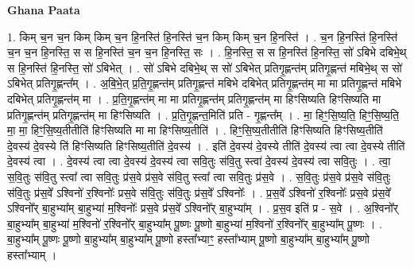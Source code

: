 \documentclass[17pt]{extarticle}
\begin{document}
\textbf{Ghana Paata } \newline

1. किम् च॒न च॒न किम् किम् च॒न हि॒नस्ति॑ हि॒नस्ति॑ च॒न किम् किम् च॒न हि॒नस्ति॑ । . च॒न हि॒नस्ति॑ हि॒नस्ति॑ च॒न च॒न हि॒नस्ति॒ स स हि॒नस्ति॑ च॒न च॒न हि॒नस्ति॒ सः । . हि॒नस्ति॒ स स हि॒नस्ति॑ हि॒नस्ति॒ सो॑ ऽबिभे दबिभे॒थ् स हि॒नस्ति॑ हि॒नस्ति॒ सो॑ ऽबिभेत् । . सो॑ ऽबिभे दबिभे॒थ् स सो॑ ऽबिभेत् प्रतिगृ॒ह्णन्त॑म् प्रतिगृ॒ह्णन्त॑ मबिभे॒थ् स सो॑ ऽबिभेत् प्रतिगृ॒ह्णन्त᳚म् । . अ॒बि॒भे॒त् प्र॒ति॒गृ॒ह्णन्त॑म् प्रतिगृ॒ह्णन्त॑ मबिभे दबिभेत् प्रतिगृ॒ह्णन्त॑म् मा मा प्रतिगृ॒ह्णन्त॑ मबिभे दबिभेत् प्रतिगृ॒ह्णन्त॑म् मा । . प्र॒ति॒गृ॒ह्णन्त॑म् मा मा प्रतिगृ॒ह्णन्त॑म् प्रतिगृ॒ह्णन्त॑म् मा हिꣳसिष्यति हिꣳसिष्यति मा प्रतिगृ॒ह्णन्त॑म् प्रतिगृ॒ह्णन्त॑म् मा हिꣳसिष्यति । . प्र॒ति॒गृ॒ह्णन्त॒मिति॑ प्रति - गृ॒ह्णन्त᳚म् । . मा॒ हिꣳ॒॒सि॒ष्य॒ति॒ हिꣳ॒॒सि॒ष्य॒ति॒ मा॒ मा॒ हिꣳ॒॒सि॒ष्य॒तीतीति॑ हिꣳसिष्यति मा मा हिꣳसिष्य॒तीति॑ । . हिꣳ॒॒सि॒ष्य॒तीतीति॑ हिꣳसिष्यति हिꣳसिष्य॒तीति॑ दे॒वस्य॑ दे॒वस्ये ति॑ हिꣳसिष्यति हिꣳसिष्य॒तीति॑ दे॒वस्य॑ । . इति॑ दे॒वस्य॑ दे॒वस्ये तीति॑ दे॒वस्य॑ त्वा त्वा दे॒वस्ये तीति॑ दे॒वस्य॑ त्वा । . दे॒वस्य॑ त्वा त्वा दे॒वस्य॑ दे॒वस्य॑ त्वा सवि॒तुः स॑वि॒तु स्त्वा॑ दे॒वस्य॑ दे॒वस्य॑ त्वा सवि॒तुः । . त्वा॒ स॒वि॒तुः स॑वि॒तु स्त्वा᳚ त्वा सवि॒तुः प्र॑स॒वे प्र॑स॒वे स॑वि॒तु स्त्वा᳚ त्वा सवि॒तुः प्र॑स॒वे । . स॒वि॒तुः प्र॑स॒वे प्र॑स॒वे स॑वि॒तुः स॑वि॒तुः प्र॑स॒वे᳚ ऽश्विनो॑ र॒श्विनोः᳚ प्रस॒वे स॑वि॒तुः स॑वि॒तुः प्र॑स॒वे᳚ ऽश्विनोः᳚ । . प्र॒स॒वे᳚ ऽश्विनो॑ र॒श्विनोः᳚ प्रस॒वे प्र॑स॒वे᳚ ऽश्विनो᳚र् बा॒हुभ्या᳚म् बा॒हुभ्या॑ म॒श्विनोः᳚ प्रस॒वे प्र॑स॒वे᳚ ऽश्विनो᳚र् बा॒हुभ्या᳚म् । . प्र॒स॒व इति॑ प्र - स॒वे । . अ॒श्विनो᳚र् बा॒हुभ्या᳚म् बा॒हुभ्या॑ म॒श्विनो॑ र॒श्विनो᳚र् बा॒हुभ्या᳚म् पू॒ष्णः पू॒ष्णो बा॒हुभ्या॑ म॒श्विनो॑ र॒श्विनो᳚र् बा॒हुभ्या᳚म् पू॒ष्णः । . बा॒हुभ्या᳚म् पू॒ष्णः पू॒ष्णो बा॒हुभ्या᳚म् बा॒हुभ्या᳚म् पू॒ष्णो हस्ता᳚भ्याꣳ॒॒ हस्ता᳚भ्याम् पू॒ष्णो बा॒हुभ्या᳚म् बा॒हुभ्या᳚म् पू॒ष्णो हस्ता᳚भ्याम् । \newline
\end{document}
